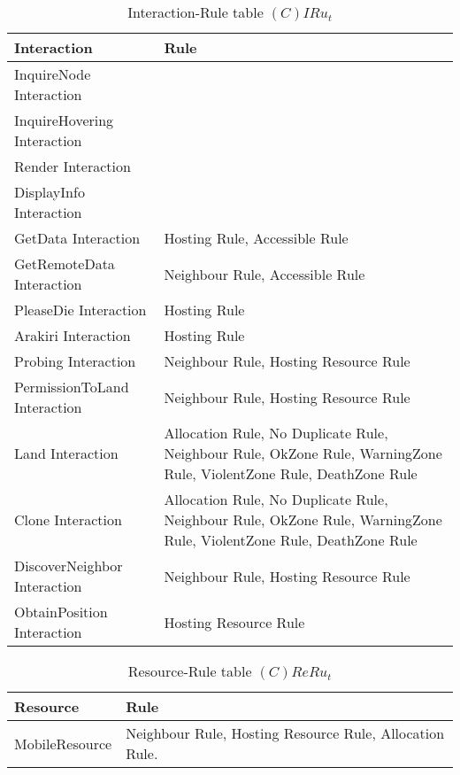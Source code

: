 \begin{table}[H]
	\centering
	\begin{tabular}{|p{4cm}|p{8cm}|}
			\hline
			\textbf{Interaction} & \textbf{Rule} \\
			\hline
			InquireNode Interaction &\\
			\hline
      InquireHovering Interaction &\\
			\hline
			Render Interaction &\\
			\hline
			DisplayInfo Interaction &\\
			\hline
			GetData Interaction & Hosting Rule, Accessible Rule \\
			\hline
      GetRemoteData Interaction & Neighbour Rule, Accessible Rule \\
			\hline
			PleaseDie Interaction & Hosting Rule \\
			\hline
			Arakiri Interaction & Hosting Rule \\
			\hline
      Probing Interaction & Neighbour Rule, Hosting Resource Rule\\
			\hline
      PermissionToLand Interaction & Neighbour Rule, Hosting Resource Rule\\
			\hline
      Land Interaction & Allocation Rule, No Duplicate Rule, Neighbour Rule,
      OkZone Rule, WarningZone Rule, ViolentZone Rule, DeathZone Rule \\
			\hline
      Clone Interaction & Allocation Rule, No Duplicate Rule, Neighbour Rule,
      OkZone Rule, WarningZone Rule, ViolentZone Rule, DeathZone Rule \\
			\hline
      DiscoverNeighbor Interaction & Neighbour Rule, Hosting Resource Rule \\
			\hline
      ObtainPosition Interaction & Hosting Resource Rule \\
			\hline
		\end{tabular}
	\caption{Interaction-Rule table $(C)IRu_t$}
	\label{tab:cirut}
\end{table}

\begin{table}[H]
	\centering
	\begin{tabular}{|p{4cm}|p{8cm}|}
			\hline
			\textbf{Resource} & \textbf{Rule} \\
			\hline
      MobileResource & Neighbour Rule, Hosting Resource Rule, Allocation Rule. \\
			\hline
		\end{tabular}
	\caption{Resource-Rule table $(C)ReRu_t$}
	\label{tab:crerut}
\end{table}

